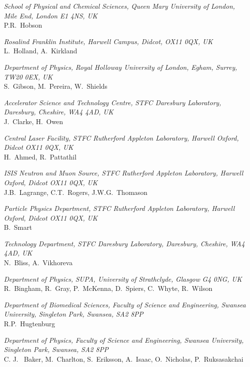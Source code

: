 \vspace{0.5cm}
\noindent \textit{School of Physical and Chemical Sciences, Queen Mary University of London, Mile End, London E1 4NS, UK} \\
P.R.~Hobson
 
\vspace{0.5cm}
\noindent \textit{Rosalind Franklin Institute, Harwell Campus, Didcot, OX11 0QX, UK} \\
L.~Holland, A.~Kirkland
 
\vspace{0.5cm}
\noindent \textit{Department of Physics, Royal Holloway University of London, Egham, Surrey, TW20 0EX, UK} \\
S.~Gibson, M.~Pereira, W.~Shields
 
\vspace{0.5cm}
\noindent \textit{Accelerator Science and Technology Centre, STFC Daresbury Laboratory, Daresbury, Cheshire, WA4 4AD, UK} \\
J.~Clarke, H.~Owen
 
\vspace{0.5cm}
\noindent \textit{Central Laser Facility, STFC Rutherford Appleton Laboratory, Harwell Oxford, Didcot OX11 0QX, UK} \\
H.~Ahmed, R.~Pattathil
 
\vspace{0.5cm}
\noindent \textit{ISIS Neutron and Muon Source, STFC Rutherford Appleton Laboratory, Harwell Oxford, Didcot OX11 0QX, UK} \\
J.B.~Lagrange, C.T.~Rogers, J.W.G.~Thomason
 
\vspace{0.5cm}
\noindent \textit{Particle Physics Department, STFC Rutherford Appleton Laboratory, Harwell Oxford, Didcot OX11 0QX, UK} \\
B.~Smart
 
\vspace{0.5cm}
\noindent \textit{Technology Department, STFC Daresbury Laboratory, Daresbury, Cheshire, WA4 4AD, UK} \\
N.~Bliss, A.~Vikhoreva
 
\vspace{0.5cm}
\noindent \textit{Department of Physics, SUPA, University of Strathclyde, Glasgow G4 0NG, UK} \\
R.~Bingham, R.~Gray, P.~McKenna, D.~Spiers, C.~Whyte, R.~Wilson
 
\vspace{0.5cm}
\noindent \textit{Department of Biomedical Sciences, Faculty of Science and Engineering, Swansea University, Singleton Park, Swansea, SA2 8PP} \\
R.P.~Hugtenburg
 
\vspace{0.5cm}
\noindent \textit{Department of Physics, Faculty of Science and Engineering, Swansea University, Singleton Park, Swansea, SA2 8PP} \\
C. J. ~Baker, M.~Charlton, S.~Eriksson, A.~Isaac, O.~Nicholas, P.~Ruksasakchai
 
\vspace{0.5cm}
